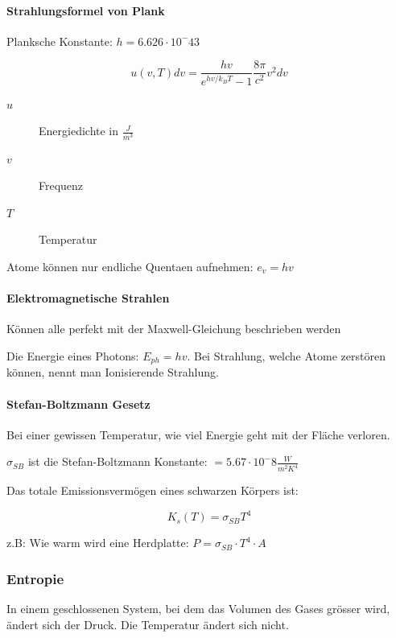 \documentclass[a4paper]{scrartcl}
\begin{document}
\paragraph{Strahlungsformel von Plank}

Planksche Konstante: $h = 6.626 \cdot 10^-43$

\[
	u(v,T)dv = \frac{hv}{e^{hv/k_BT} - 1} \frac{8\pi}{c^2} v^2 dv
\]

\begin{description}
	\item[$u$] Energiedichte in $\frac{J}{m^3}$
	\item[$v$] Frequenz
	\item[$T$] Temperatur
\end{description}

Atome können nur endliche Quentaen aufnehmen: $e_v = hv$


\paragraph{Elektromagnetische Strahlen}

Können alle perfekt mit der Maxwell-Gleichung beschrieben werden


Die Energie eines Photons: $E_{ph} = hv$. Bei Strahlung, welche Atome zerstören können, nennt man Ionisierende Strahlung.




\paragraph{Stefan-Boltzmann Gesetz}

Bei einer gewissen Temperatur, wie viel Energie geht mit der Fläche verloren.

$\sigma_{SB}$ ist die Stefan-Boltzmann Konstante: $=5.67 \cdot 10^-8 \frac{W}{m^2 K^4}$

Das totale Emissionsvermögen eines schwarzen Körpers ist:

\[
	K_s(T) = \sigma_{SB} T^4
\]

z.B: Wie warm wird eine Herdplatte: $P = \sigma_{SB} \cdot T^4 \cdot A$

 
\subsubsection{Entropie}

In einem geschlossenen System, bei dem das Volumen des Gases grösser wird, ändert sich der Druck. Die Temperatur ändert sich nicht.
\end{document}
